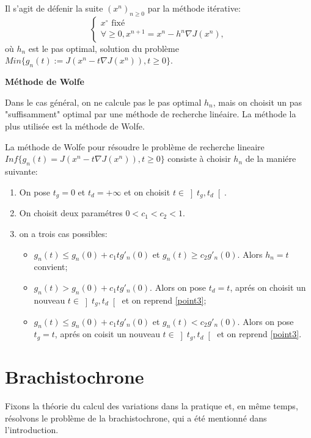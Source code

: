 \documentclass[10pt,a4paper]{article}%
\theoremstyle{theorem}
\theoremstyle{definition}
\begin{document}
			Il s'agit de défenir la suite $(x^n)_{n \ge 0}$ par la méthode itérative:
				\begin{equation}
					\begin{cases*}
						x^\circ \text{ fixé}
						\\
						\forall\ge 0,  x^{n+1}=x^n-h^n\nabla J(x^n),
					\end{cases*}
				\end{equation}
			où $h_n$ est le pas optimal, solution du problème $Min\{g_n(t):=J(x^n-t\nabla J(x^n)), t\ge 0\}$.
			
			\textbf{Méthode de Wolfe}
			
			Dans le cas général, on ne calcule pas le pas optimal $h_n$, mais on choisit un pas "suffisamment" optimal par une méthode de recherche linéaire. La méthode la plus utilisée est la méthode de Wolfe. 
			
			La méthode de Wolfe pour résoudre le problème de recherche lineaire $Inf\{ g_n(t)=J(x^n-t\nabla J(x^n)), t\ge 0\}$ consiste à choisir $h_n$ de la maniére suivante:
			
				\begin{enumerate}
					\item On pose $t_g=0$ et $t_d=+\infty$ et on choisit $t\in \left] t_g,t_d\right[$.
					\item On choisit deux paramétres $0<c_1<c_2<1$.
					\item\label{point3} on a trois cas possibles:
					\begin{itemize}
						\item $g_n(t)\le g_n(0)+c_1tg'_n(0)$ et $g_n(t)\ge c_2g'_n(0)$. Alors $h_n=t$ convient;
						\item $g_n(t)> g_n(0)+c_1tg'_n(0)$. Alors on pose $t_d=t$, aprés on choisit un nouveau $t\in \left]t_g,t_d\right[$ et on reprend \ref{point3};
						\item $g_n(t)\le g_n(0)+c_1tg'_n(0)$ et $g_n(t)< c_2g'_n(0)$. Alors on pose $t_g=t$, aprés  on coisit un nouveau $t \in \left] t_g,t_d\right[$ et on reprend \ref{point3}.
					\end{itemize}
				\end{enumerate}
	
	\section{Brachistochrone}
	
	Fixons la théorie du calcul des variations dans la pratique et, en même temps, résolvons le problème de la brachistochrone, qui a été mentionné dans l'introduction.
	
\end{document}
